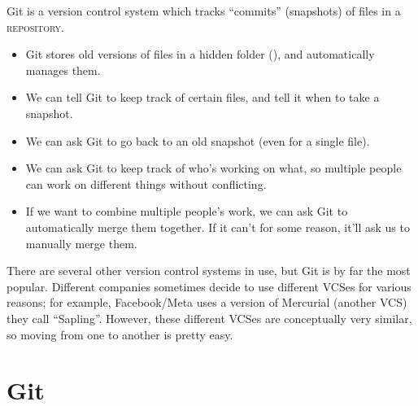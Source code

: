 \begin{frame}{Git}
  \vspace{-0.5em}
   is a version control system which tracks \enquote{commits}
  (snapshots) of files in a \textsc{repository}.
  \pause
  \begin{itemize}
    \item
      Git stores old versions of files in a hidden folder (), and
      automatically manages them.
      \pause
    \item
      We can tell Git to keep track of certain files, and tell it when to take
      a snapshot.
      \pause
    \item
      We can ask Git to go back to an old snapshot (even for a single file).
      \pause
    \item
      We can ask Git to keep track of who's working on what, so multiple people
      can work on different things without conflicting.
      \pause
    \item
      If we want to combine multiple people's work, we can ask Git to
      automatically merge them together. If it can't for some reason, it'll ask
      us to manually merge them.
  \end{itemize}
\end{frame}

There are several other version control systems in use, but Git is by far the
most popular.  Different companies sometimes decide to use different VCSes for
various reasons; for example, Facebook/Meta uses a version of Mercurial
(another VCS) they call \enquote{Sapling}.  However, these different VCSes are
conceptually very similar, so moving from one to another is pretty easy.

\section{Git}

